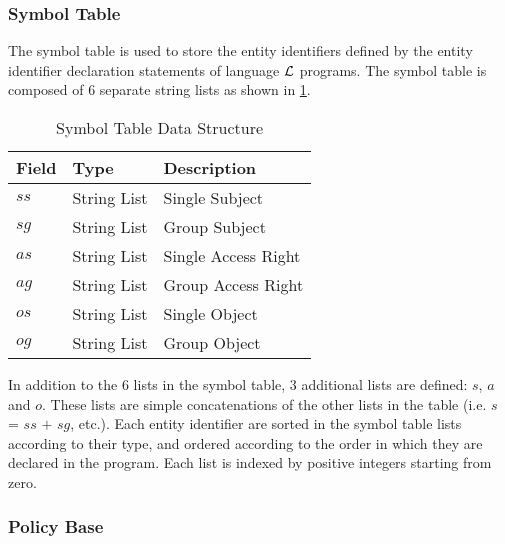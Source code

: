 \documentclass[11pt]{report}
\begin{document}
        \subsubsection{Symbol Table}

          The symbol table is used to store the entity identifiers defined by
          the entity identifier declaration statements of language ${\cal L}$
          programs. The symbol table is composed of 6 separate string lists
          as shown in \ref{tabl-polup-sytab}.

          \begin{table}[tbhp]
            \begin{center}
              \begin{tabular}[t]{|l|l|l|}
                \hline
                \textbf{Field} & \textbf{Type}  & \textbf{Description} \\
                \hline
                $ss$           & String List    & Single Subject \\
                \hline
                $sg$           & String List    & Group Subject \\
                \hline
                $as$           & String List    & Single Access Right \\
                \hline
                $ag$           & String List    & Group Access Right \\
                \hline
                $os$           & String List    & Single Object \\
                \hline
                $og$           & String List    & Group Object \\
                \hline
              \end{tabular}
            \end{center}
            \caption{Symbol Table Data Structure}
            \label{tabl-polup-sytab}
          \end{table}

          In addition to the 6 lists in the symbol table, 3 additional lists
          are defined: $s$, $a$ and $o$. These lists are simple concatenations
          of the other lists in the table (i.e. $s$ = $ss$ $+$ $sg$, etc.).
          Each entity identifier are sorted in the symbol table lists
          according to their type, and ordered according to the order in which
          they are declared in the program. Each list is indexed by positive
          integers starting from zero.

        \subsubsection{Policy Base}
\end{document}
